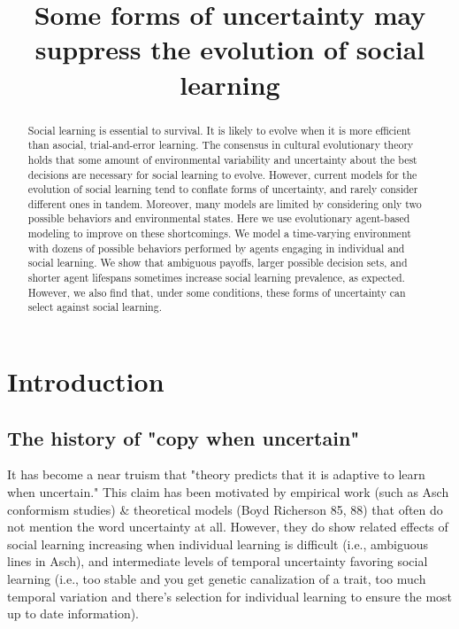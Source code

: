 \documentclass[letterpaper,11.5pt]{scrartcl}
\title{Some forms of uncertainty may suppress the evolution of social learning}
\author{{}}
\begin{document}
\maketitle

\newcommand{\pisub}[1]{\pi_{\mathrm{#1}}}
\newcommand{\pilow}{\pisub{low}}
\newcommand{\pihigh}{\pisub{high}}

\newcommand{\meansl}{\langle s \rangle}


\begin{abstract}

Social learning is essential to survival. It is likely to evolve when it is more
efficient than asocial, trial-and-error learning. The consensus in cultural
evolutionary theory holds that some amount of environmental variability and
uncertainty about the best decisions are necessary for social learning to evolve.
However, current models for the evolution of social learning tend to conflate forms
of uncertainty, and rarely consider different ones in tandem. Moreover, many models
are limited by considering only two possible behaviors and environmental states.
Here we use evolutionary agent-based modeling to improve on these shortcomings. We
model a time-varying environment with dozens of possible behaviors performed by
agents engaging in individual and social learning. We show that ambiguous payoffs,
larger possible decision sets, and shorter agent lifespans sometimes increase social
learning prevalence, as expected. However, we also find that, under some conditions,
these forms of uncertainty can select against social learning.
\end{abstract}

\section{Introduction}

\subsection{The history of "copy when uncertain"}
It has become a near truism that "theory predicts that it is adaptive to learn when uncertain." This claim has been motivated by empirical work (such as Asch conformism studies) & theoretical models (Boyd Richerson 85, 88) that often do not mention the word uncertainty at all. However, they do show related effects of social learning increasing when individual learning is difficult (i.e., ambiguous lines in Asch), and intermediate levels of temporal uncertainty favoring social learning (i.e., too stable and you get genetic canalization of a trait, too much temporal variation and there's selection for individual learning to ensure the most up to date information).   
\end{document}
